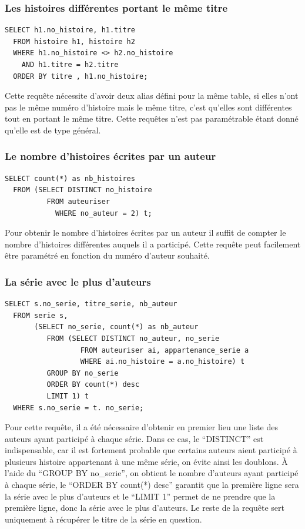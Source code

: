 \documentclass[12pt]{article}
\begin{document}
\subsubsection*{Les histoires différentes portant le même titre}
\begin{lstlisting}
SELECT h1.no_histoire, h1.titre
  FROM histoire h1, histoire h2
  WHERE h1.no_histoire <> h2.no_histoire
    AND h1.titre = h2.titre
  ORDER BY titre , h1.no_histoire;
\end{lstlisting}
Cette requête nécessite d'avoir deux alias défini pour la même table, si
elles n'ont pas le même numéro d'histoire mais le même titre, c'est qu'elles
sont différentes tout en portant le même titre. Cette requêtes n'est pas
paramétrable étant donné qu'elle est de type général.

\subsubsection*{Le nombre d'histoires écrites par un auteur}
\begin{lstlisting}
SELECT count(*) as nb_histoires
  FROM (SELECT DISTINCT no_histoire
          FROM auteuriser
	        WHERE no_auteur = 2) t;
\end{lstlisting}
Pour obtenir le nombre d'histoires écrites par un auteur il suffit de compter
le nombre d'histoires différentes auquels il a participé. Cette requête peut
facilement être paramétré en fonction du numéro d'auteur souhaité.

\subsubsection*{La série avec le plus d'auteurs}
\begin{lstlisting}
SELECT s.no_serie, titre_serie, nb_auteur
  FROM serie s,
       (SELECT no_serie, count(*) as nb_auteur
          FROM (SELECT DISTINCT no_auteur, no_serie
                  FROM auteuriser ai, appartenance_serie a
                  WHERE ai.no_histoire = a.no_histoire) t
          GROUP BY no_serie
          ORDER BY count(*) desc
          LIMIT 1) t
  WHERE s.no_serie = t. no_serie;
\end{lstlisting}
Pour cette requête, il a été nécessaire d'obtenir en premier lieu une liste
des auteurs ayant participé à chaque série. Dans ce cas, le ``DISTINCT'' est
indispensable, car il est fortement probable que certains auteurs aient
participé à plusieurs histoire appartenant à une même série, on évite ainsi
les doublons. À l'aide du ``GROUP BY no\_serie'', on obtient le nombre
d'auteurs ayant participé à chaque série, le ``ORDER BY count(*) desc''
garantit que la première ligne sera la série avec le plus d'auteurs et le
``LIMIT 1'' permet de ne prendre que la première ligne, donc la série avec
le plus d'auteurs. Le reste de la requête sert uniquement à récupérer le
titre de la série en question.
\end{document}
